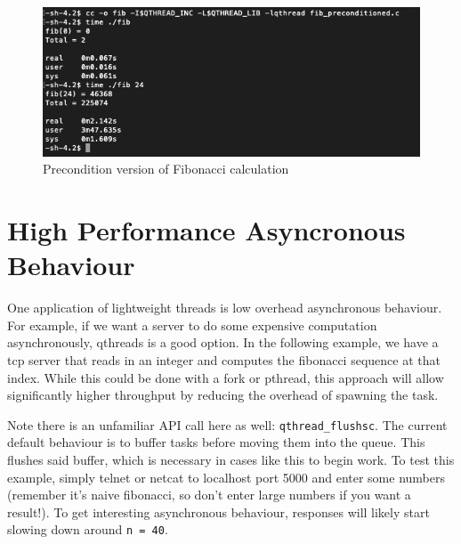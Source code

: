\documentclass[12pt,fullpage]{article}
\begin{document}
\begin{figure}
\includegraphics[scale=0.95]{images/fib_preconditioned.png}
\caption{Precondition version of Fibonacci calculation}
\end{figure}



\newpage
\section{High Performance Asyncronous Behaviour}

One application of lightweight threads is low overhead asynchronous behaviour.
For example, if we want a server to do some expensive computation
asynchronously, qthreads is a good option. In the following example, we have a
tcp server that reads in an integer and computes the fibonacci sequence at that
index. While this could be done with a fork or pthread, this approach will allow
significantly higher throughput by reducing the overhead of spawning the task.  



Note there is an unfamiliar API call here as well: {\tt qthread\_flushsc}. The
current default behaviour is to buffer tasks before moving them into the queue.
This flushes said buffer, which is necessary in cases like this to begin work.
To test this example, simply telnet or netcat to localhost port 5000 and
enter some numbers (remember it's naive fibonacci, so don't enter large numbers
if you want a result!). To get interesting asynchronous behaviour, responses will
likely start slowing down around {\tt n = 40}.

\end{document}
